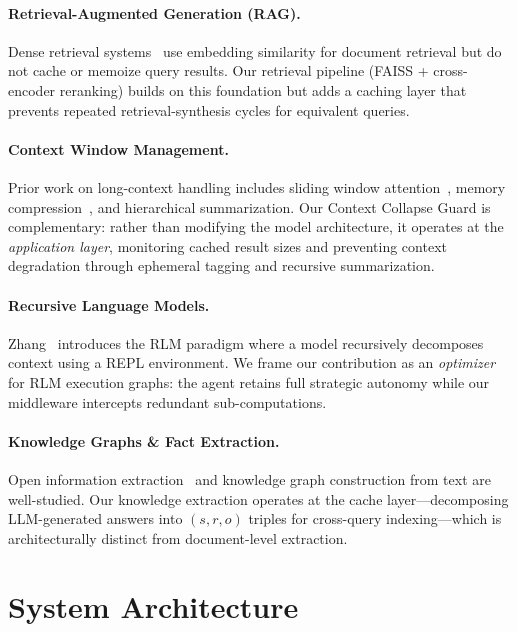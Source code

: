 \documentclass[11pt,twocolumn]{article}
\begin{document}
\paragraph{Retrieval-Augmented Generation (RAG).}
Dense retrieval systems~\cite{karpukhin2020dense, lewis2020rag} use embedding similarity for document retrieval but do not cache or memoize query results. Our retrieval pipeline (FAISS + cross-encoder reranking) builds on this foundation but adds a caching layer that prevents repeated retrieval-synthesis cycles for equivalent queries.

\paragraph{Context Window Management.}
Prior work on long-context handling includes sliding window attention~\cite{beltagy2020longformer}, memory compression~\cite{chevalier2023adapting}, and hierarchical summarization. Our Context Collapse Guard is complementary: rather than modifying the model architecture, it operates at the \textit{application layer}, monitoring cached result sizes and preventing context degradation through ephemeral tagging and recursive summarization.

\paragraph{Recursive Language Models.}
Zhang~\cite{zhang2025rlm} introduces the RLM paradigm where a model recursively decomposes context using a REPL environment. We frame our contribution as an \textit{optimizer} for RLM execution graphs: the agent retains full strategic autonomy while our middleware intercepts redundant sub-computations.

\paragraph{Knowledge Graphs \& Fact Extraction.}
Open information extraction~\cite{mausam2016open} and knowledge graph construction from text are well-studied. Our knowledge extraction operates at the cache layer---decomposing LLM-generated answers into $(s, r, o)$ triples for cross-query indexing---which is architecturally distinct from document-level extraction.

\section{System Architecture}
\label{sec:arch}
\end{document}
